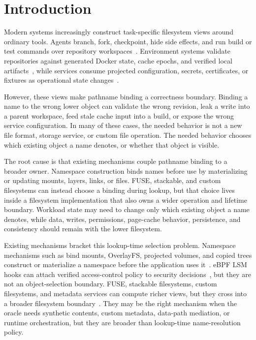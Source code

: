 \section{Introduction}

Modern systems increasingly construct task-specific filesystem views around
ordinary tools. Agents branch, fork, checkpoint, hide side effects, and run
build or test commands over repository
workspaces~\cite{agentfs_repo,branchfs_repo,yolofs_repo}. Environment systems
validate repositories against generated Docker state, cache epochs, and verified
local artifacts~\cite{docker_overview,swe_factory_repo,menvagent_repo,swe_rebench_v2_repo},
while services consume projected configuration, secrets, certificates, or
fixtures as operational state changes~\cite{kubernetes_projected_volumes,kubernetes_configmaps,kubernetes_secrets}.

However, these views make pathname binding a correctness boundary. Binding a
name to the wrong lower object can validate the wrong revision, leak a write
into a parent workspace, feed stale cache input into a build, or expose the
wrong service configuration. In many of these cases, the needed behavior is not
a new file format, storage service, or custom file operation. The needed
behavior chooses which existing object a name denotes, or whether that object is
visible.

The root cause is that existing mechanisms couple pathname binding to a broader
owner. Namespace construction binds names before use by materializing or
updating mounts, layers, links, or files. FUSE, stackable, and custom
filesystems can instead choose a binding during lookup, but that choice lives
inside a filesystem implementation that also owns a wider operation and
lifetime boundary. Workload state may need to change only which existing object
a name denotes, while data, writes, permissions, page-cache behavior,
persistence, and consistency should remain with the lower filesystem.

Existing mechanisms bracket this lookup-time selection problem. Namespace
mechanisms such as bind mounts, OverlayFS, projected volumes, and copied trees
construct or materialize a namespace before the application uses
it~\cite{linux_mount,linux_overlayfs,kubernetes_projected_volumes}.
eBPF LSM hooks can attach verified access-control policy to security
decisions~\cite{linux_bpf_lsm},
but they are not an object-selection boundary. FUSE, stackable filesystems,
custom filesystems, and metadata services can compute richer views, but they
cross into a broader filesystem boundary~\cite{linux_fuse,wrapfs,bento,deltafs_sc21,indexfs,tablefs}.
They may be the right mechanism when the oracle needs synthetic contents,
custom metadata, data-path mediation, or runtime orchestration, but they are
broader than lookup-time name-resolution policy.


